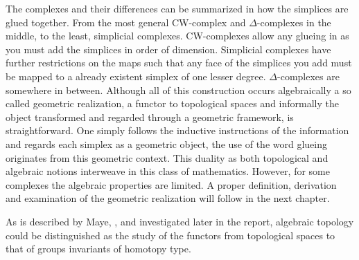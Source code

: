 \documentclass[../../main.tex]{subfiles}
\begin{document}
    The complexes and their differences can be summarized in how the simplices are glued together. From the most general CW-complex and $\Delta$-complexes in the middle, to the least, simplicial complexes. CW-complexes allow any glueing in as you must add the simplices in order of dimension. Simplicial complexes have further restrictions on the maps such that any face of the simplices you add must be mapped to a already existent simplex of one lesser degree. $\Delta$-complexes are somewhere in between. Although all of this construction occurs algebraically a so called geometric realization, a functor to topological spaces and informally the object transformed and regarded through a geometric framework, is straightforward. One simply follows the inductive instructions of the information and regards each simplex as a geometric object, the use of the word glueing originates from this geometric context. This duality as both topological and algebraic notions interweave in this class of mathematics. However, for some complexes the algebraic properties are limited. A proper definition, derivation and examination of the geometric realization will follow in the next chapter.

    As is described by Maye, \cite{simp-maye}, and investigated later in the report, algebraic topology could be distinguished as the study of the functors from topological spaces to that of groups invariants of homotopy type. 

    
\end{document}
